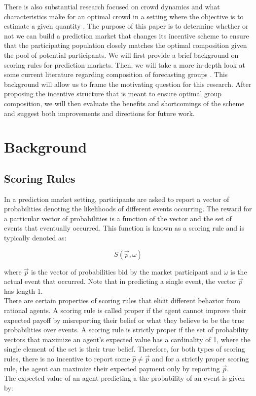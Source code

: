 \documentclass[twoside,twocolumn]{article}
\begin{document}
\newline
There is also substantial research focused on crowd dynamics and what characteristics make for an optimal crowd in a setting where the objective is to estimate a given quantity \cite{3}. The purpose of this paper is to determine whether or not we can build a prediction market that changes its incentive scheme to ensure that the participating population closely matches the optimal composition given the pool of potential participants. We will first provide a brief background on scoring rules for prediction markets. Then, we will take a more in-depth look at some current literature regarding composition of forecasting groups \cite{3}. This background will allow us to frame the motivating question for this research. After proposing the incentive structure that is meant to ensure optimal group composition, we will then evaluate the benefits and shortcomings of the scheme and suggest both improvements and directions for future work.


\section{Background}

\subsection{Scoring Rules}

In a prediction market setting, participants are asked to report a vector of probabilities denoting the likelihoods of different events occurring. The reward for a particular vector of probabilities is a function of the vector and the set of events that eventually occurred. This function is known as a scoring rule and is typically denoted as:

\begin{equation}
\label{scoringrule}
S(\vec{p}, \omega)
\end{equation}

where $\vec{p}$ is the vector of probabilities bid by the market participant and $\omega$ is the actual event that occurred. Note that in predicting a single event, the vector $\vec{p}$ has length 1.\\
\newline
There are certain properties of scoring rules that elicit different behavior from rational agents. A scoring rule is called proper if the agent cannot improve their expected payoff by misreporting their belief or what they believe to be the true probabilities over events. A scoring rule
is strictly proper if the set of probability vectors that maximize an agent's expected value has a cardinality of 1, where the single element of the set is their true belief. Therefore, for both types of scoring rules, there is no incentive to report some $\hat{p} \neq \vec{p}$ and for a strictly proper scoring rule, the agent can maximize their expected payment only by reporting $\vec{p}$.\\
\newline
The expected value of an agent predicting a the probability of an event is given by:
\end{document}
